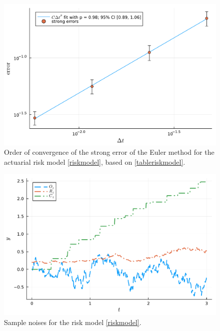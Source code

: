 \documentclass[reqno,12pt]{amsart}
\theoremstyle{plain} %
\theoremstyle{definition} %
\begin{document}
\begin{figure}[htb]
    \includegraphics[scale=0.6]{img/convergence_riskmodel.pdf}
    \caption{Order of convergence of the strong error of the Euler method for the actuarial risk model \eqref{riskmodel}, based on \cref{tableriskmodel}.}
    \label{figriskmodel}
\end{figure}

\begin{figure}[htb]
    \includegraphics[scale=0.6]{img/riskmodel_noises.pdf}
    \caption{Sample noises for the risk model \eqref{riskmodel}.}
    \label{figriskmodelnoise}
\end{figure}
\end{document}
